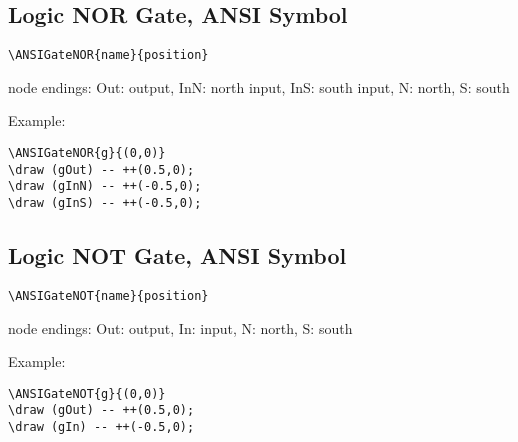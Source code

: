 \documentclass[parskip=full]{scrartcl}
\begin{document}
\subsection{Logic NOR Gate, ANSI Symbol}

\begin{verbatim}
\ANSIGateNOR{name}{position}
\end{verbatim}
node endings: Out: output,
              InN: north input, InS: south input,
              N: north, S: south

Example:\\
\begin{minipage}{0.8\textwidth}
\begin{verbatim}
\ANSIGateNOR{g}{(0,0)}
\draw (gOut) -- ++(0.5,0);
\draw (gInN) -- ++(-0.5,0);
\draw (gInS) -- ++(-0.5,0);
\end{verbatim}
\end{minipage}
\begin{minipage}{0.19\textwidth}
\end{minipage}

\subsection{Logic NOT Gate, ANSI Symbol}

\begin{verbatim}
\ANSIGateNOT{name}{position}
\end{verbatim}
node endings: Out: output, In: input,
              N: north, S: south

Example:\\
\begin{minipage}{0.8\textwidth}
\begin{verbatim}
\ANSIGateNOT{g}{(0,0)}
\draw (gOut) -- ++(0.5,0);
\draw (gIn) -- ++(-0.5,0);
\end{verbatim}
\end{minipage}
\begin{minipage}{0.19\textwidth}
\end{minipage}
\end{document}
